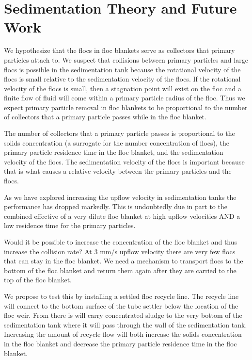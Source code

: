 \documentclass[letterpaper,10pt,english]{sphinxmanual}
\begin{document}
\chapter{Sedimentation Theory and Future Work}
\label{\detokenize{Sedimentation/Sed_Theory_and_Future_Work:sedimentation-theory-and-future-work}}\label{\detokenize{Sedimentation/Sed_Theory_and_Future_Work::doc}}
We hypothesize that the flocs in floc blankets serve as collectors that primary particles attach to. We suspect that collisions between primary particles and large flocs is possible in the sedimentation tank because the rotational velocity of the flocs is small relative to the sedimentation velocity of the flocs. If the rotational velocity of the flocs is small, then a stagnation point will exist on the floc and a finite flow of fluid will come within a primary particle radius of the floc. Thus we expect primary particle removal in floc blankets to be proportional to the number of collectors that a primary particle passes while in the floc blanket.

The number of collectors that a primary particle passes is proportional to the solids concentration (a surrogate for the number concentration of flocs), the primary particle residence time in the floc blanket, and the sedimentation velocity of the flocs. The sedimentation velocity of the flocs is important because that is what causes a relative velocity between the primary particles and the flocs.

As we have explored increasing the upflow velocity in sedimentation tanks the performance has dropped markedly. This is undoubtedly due in part to the combined effective of a very dilute floc blanket at high upflow velocities AND a low residence time for the primary particles.

Would it be possible to increase the concentration of the floc blanket and thus increase the collision rate? At 3 mm/s upflow velocity there are very few flocs that can stay in the floc blanket. We need a mechanism to transport flocs to the bottom of the floc blanket and return them again after they are carried to the top of the floc blanket.

We propose to test this by installing a settled floc recycle line. The recycle line will connect to the bottom surface of the tube settler below the location of the floc weir. From there is will carry concentrated sludge to the very bottom of the sedimentation tank where it will pass through the wall of the sedimentation tank. Increasing the amount of recycle flow will both increase the solids concentration in the floc blanket and decrease the primary particle residence time in the floc blanket.
\end{document}
